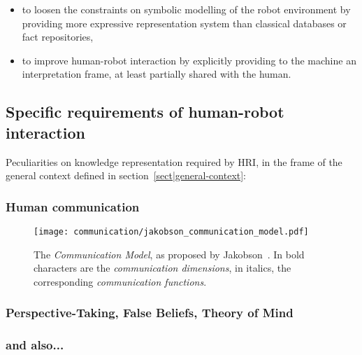 \begin{itemize}
	\item to loosen the constraints on symbolic modelling of the robot
	environment by providing more expressive representation system than
	classical databases or fact repositories,

	\item to improve human-robot interaction by explicitly providing to the
	machine an interpretation frame, at least partially shared with the human.

\end{itemize}



\subsection{Specific requirements of human-robot interaction}
\label{sect|pecularities-krs-for-hri}

Peculiarities on knowledge representation required by HRI, in the frame of the
general context defined in section~\ref{sect|general-context}:

\subsubsection{Human communication}

\begin{figure}%
\centering
  \texttt{[image: communication/jakobson\_communication\_model.pdf]}

  \caption{The \emph{Communication Model}, as proposed by
  Jakobson~\cite{Jakobson1960}. In bold characters are the \emph{communication
  dimensions}, in italics, the corresponding \emph{communication functions}.}
  
  \label{fig|jakobson_communication_model}
\end{figure}

\subsubsection{Perspective-Taking, False Beliefs, Theory of Mind}


\subsubsection{and also...}

